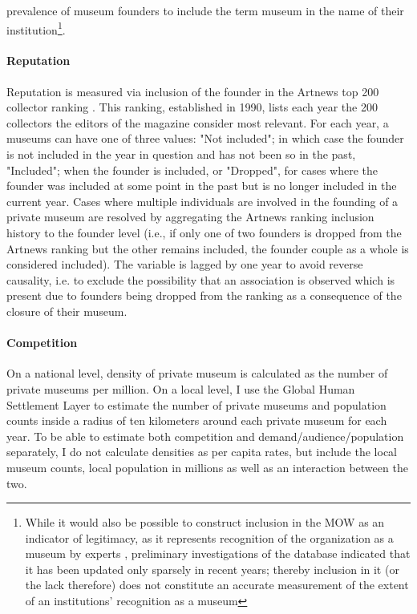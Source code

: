 \documentclass[12pt]{article}
\begin{document}
prevalence of museum founders to include the term museum in the name of their institution\footnote{While it would also be possible to construct inclusion in the MOW as an indicator of legitimacy, as it represents recognition of the organization as a museum by experts \parencite{Zuckerman_1999_illegitimacy}, preliminary investigations of the database indicated that it has been  updated only sparsely in recent years; thereby inclusion in it (or the lack therefore) does not constitute an accurate measurement of the extent of an institutions' recognition as a museum}.
\paragraph*{Reputation}


Reputation is measured via inclusion of the founder in the Artnews top 200 collector ranking \parencite{Artnews_ranking}.
This ranking, established in 1990, lists each year the 200 collectors the editors of the magazine consider most relevant.
For each year, a museums can have one of three values: "Not included"; in which case the founder is not included in the year in question and has not been so in the past, "Included"; when the founder is included, or "Dropped", for cases where the founder was included at some point in the past but is no longer included in the current year.
Cases where multiple individuals are involved in the founding of a private museum are resolved by aggregating the Artnews ranking inclusion history to the founder level (i.e., if only one of two founders is dropped from the Artnews ranking but the other remains included, the founder couple as a whole is considered included).
The variable is lagged by one year to avoid reverse causality, i.e. to exclude the possibility that an association is observed which is present due to founders being dropped from the ranking as a consequence of the closure of their museum.
\paragraph*{Competition}

On a national level, density of private museum is calculated as the number of private museums per million.
On a local level, I use the Global Human Settlement Layer \parencite{EC_2023_GHSL} to estimate the number of private museums and population counts inside a radius of ten kilometers around each private museum for each year.
To be able to estimate both competition and demand/audience/population separately, I do not calculate densities as per capita rates, but include the local museum counts, local population in millions as well as an interaction between the two.
\end{document}
